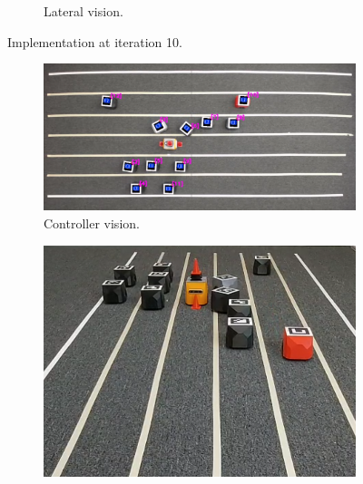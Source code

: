\begin{appendix}
\begin{figure}[H]
\begin{subfigure}[b]{0.50\textwidth}
    \caption{Lateral vision.}
    \label{fig:third}
\end{subfigure}
\caption{Implementation at iteration 10.}
\label{fig:figures}
\end{figure}





\begin{figure}[H]
\centering
\begin{subfigure}[t]{\textwidth}
    \includegraphics[width=\textwidth]{Anexos/obs_avoid/obs_avoid_it40_cam0.png}
    \caption{Controller vision.}
    \label{fig:first}
\end{subfigure}
\vspace{1cm}
\begin{subfigure}[b]{0.4\textwidth}
    \includegraphics[width=\textwidth]{Anexos/obs_avoid/obs_avoid_it40_cam1.png}

\end{subfigure}
\end{figure}
\end{appendix}
